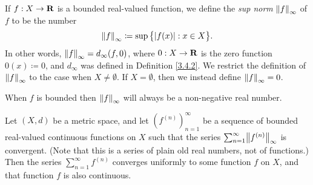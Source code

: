 \setcounter{theorem}{4}
\begin{definition}\label{3.5.5}
    If \(f : X \to \R\) is a bounded real-valued function, we define the \emph{sup norm} \(\norm*{f}_\infty\) of \(f\) to be the number
    \[
        \norm*{f}_\infty \coloneqq \sup\big\{\abs{f(x)} : x \in X\big\}.
    \]
    In other words, \(\norm*{f}_\infty = d_\infty(f, 0)\), where \(0 : X \to \R\) is the zero function \(0(x) \coloneqq 0\), and \(d_\infty\) was defined in Definition \ref{3.4.2}.
    We restrict the definition of \(\norm*{f}_\infty\) to the case when \(X \neq \emptyset\).
    If \(X = \emptyset\), then we instead define \(\norm*{f}_\infty = 0\).
\end{definition}

\begin{note}
    When \(f\) is bounded then \(\norm*{f}_\infty\) will always be a non-negative real number.
\end{note}

\setcounter{theorem}{6}
\begin{theorem}\label{3.5.7}
    Let \((X, d)\) be a metric space, and let \((f^{(n)})_{n = 1}^\infty\) be a sequence of bounded real-valued continuous functions on \(X\) such that the series \(\sum_{n = 1}^\infty \norm*{f^{(n)}}_\infty\) is convergent.
    (Note that this is a series of plain old real numbers, not of functions.)
    Then the series \(\sum_{n = 1}^\infty f^{(n)}\) converges uniformly to some function \(f\) on \(X\), and that function \(f\) is also continuous.
\end{theorem}

